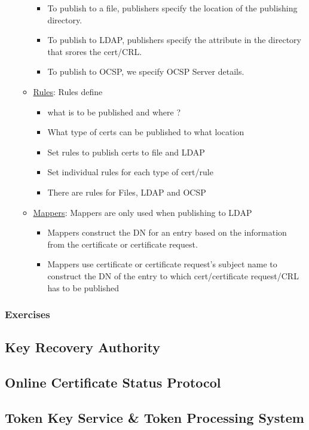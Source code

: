 \documentclass[a4paper]{article}
\begin{document}
\begin{itemize}
\begin{itemize}
\begin{itemize}
                            \item To publish to a file, publishers specify the location of the publishing directory.
                            \item To publish to LDAP, publishers specify the attribute in the directory that srores the cert/CRL.
                            \item To publish to OCSP, we specify OCSP Server details. 
                        \end{itemize}
                    \item \underline{Rules}: Rules define 
                        \begin{itemize}
                            \item what is to be published and where ?
                            \item What type of certs can be published to what location
                            \item Set rules to publish certs to file and LDAP
                            \item Set individual rules for each type of cert/rule
                            \item There are rules for Files, LDAP and OCSP
                        \end{itemize}
                    \item \underline{Mappers}: Mappers are only used when publishing to LDAP
                        \begin{itemize}
                            \item Mappers construct the DN for an entry based on the information
                                from the certificate or certificate request. 
                            \item Mappers use certificate or certificate request's subject name to
                                construct the DN of the entry to which cert/certificate request/CRL has to be published
                        \end{itemize}
            \end{itemize}
    \end{itemize}
\subsubsection{Exercises}
\subsection{Key Recovery Authority}
\subsection{Online Certificate Status Protocol}
\subsection{Token Key Service \& Token Processing System}
\end{document}
